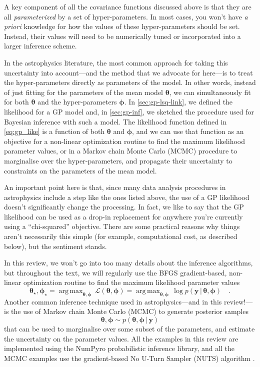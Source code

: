 \documentclass[letterpaper]{ar-1col}
\newcommand{\ydata}{\ensuremath{\boldsymbol{y}}}
\newcommand{\hyperparams}{\ensuremath{\boldsymbol{\phi}}}
\newcommand{\meanparams}{\ensuremath{\boldsymbol{\theta}}}
\DeclareMathOperator*{\argmax}{arg\,max}
\begin{document}
A key component of all the covariance functions discussed above is that they are all \emph{parameterized} by a set of hyper-parameters.
In most cases, you won't have \emph{a priori} knowledge for how the values of these hyper-parameters should be set.
Instead, their values will need to be numerically tuned or incorporated into a larger inference scheme.

In the astrophysics literature, the most common approach for taking this uncertainty into account---and the method that we advocate for here---is to treat the hyper-parameters directly as parameters of the model.
In other words, instead of just fitting for the parameters of the mean model $\meanparams$, we can simultaneously fit for both $\meanparams$ and the hyper-parameters $\hyperparams$.
In \autoref{sec:gp-lsq-link}, we defined the likelihood for a GP model and, in \autoref{sec:gp-inf}, we sketched the procedure used for Bayesian inference with such a model.
The likelihood function defined in \autoref{eq:gp_like} is a function of both $\meanparams$ and $\hyperparams$, and we can use that function as an objective for a non-linear optimization routine to find the maximum likelihood parameter values, or in a Markov chain Monte Carlo (MCMC) procedure to marginalise over the hyper-parameters, and propagate their uncertainty to constraints on the parameters of the mean model.

An important point here is that, since many data analysis procedures in astrophysics include a step like the ones listed above, the use of a GP likelihood doesn't significantly change the processing.
In fact, we like to say that the GP likelihood can be used as a drop-in replacement for anywhere you're currently using a ``chi-squared'' objective.
There are some practical reasons why things aren't necessarily this simple (for example, computational cost, as described below), but the sentiment stands.

In this review, we won't go into too many details about the inference algorithms, but throughout the text, we will regularly use the \textsf{BFGS} gradient-based, non-linear optimization routine \citep{Nocedal:1999, scipy} to find the maximum likelihood parameter values
\begin{equation}
  \meanparams_\star,\hyperparams_\star = \argmax_{\meanparams,\hyperparams} \,\mathcal{L}(\meanparams,\hyperparams) = \argmax_{\meanparams,\hyperparams} \,\log p(\ydata\,|\,\meanparams,\hyperparams) \quad.
\end{equation}
Another common inference technique used in astrophysics---and in this review!---is the use of Markov chain Monte Carlo (MCMC) to generate posterior samples
\begin{equation}
  \meanparams,\hyperparams \sim p(\meanparams,\hyperparams\,|\,\ydata)
\end{equation}
that can be used to marginalise over some subset of the parameters, and estimate the uncertainty on the parameter values.
All the examples in this review are implemented using the \textsf{NumPyro} probabilistic inference library, and all the MCMC examples use the gradient-based No U-Turn Sampler (NUTS) algorithm \citep{Hoffman:2014}.
\end{document}
